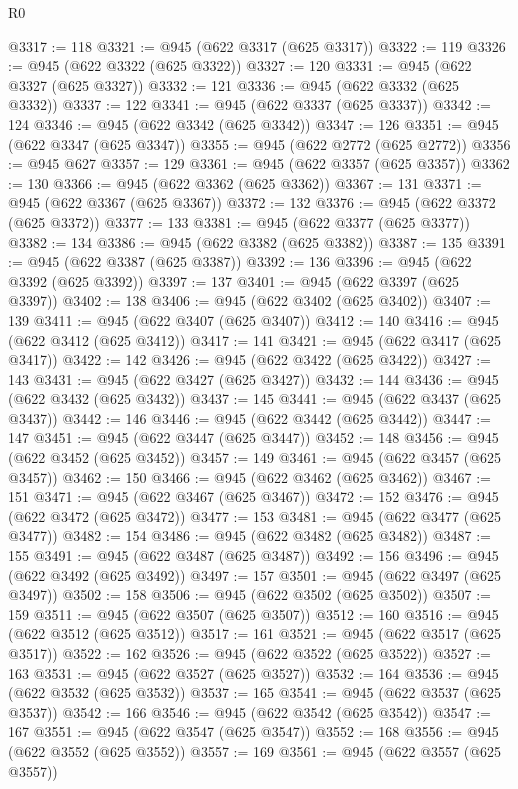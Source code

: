 \begin{lexlean}{R0}
\begin{coremodule}
@3317 := 118
@3321 := @945 (@622 @3317 (@625 @3317))
@3322 := 119
@3326 := @945 (@622 @3322 (@625 @3322))
@3327 := 120
@3331 := @945 (@622 @3327 (@625 @3327))
@3332 := 121
@3336 := @945 (@622 @3332 (@625 @3332))
@3337 := 122
@3341 := @945 (@622 @3337 (@625 @3337))
@3342 := 124
@3346 := @945 (@622 @3342 (@625 @3342))
@3347 := 126
@3351 := @945 (@622 @3347 (@625 @3347))
@3355 := @945 (@622 @2772 (@625 @2772))
@3356 := @945 @627
@3357 := 129
@3361 := @945 (@622 @3357 (@625 @3357))
@3362 := 130
@3366 := @945 (@622 @3362 (@625 @3362))
@3367 := 131
@3371 := @945 (@622 @3367 (@625 @3367))
@3372 := 132
@3376 := @945 (@622 @3372 (@625 @3372))
@3377 := 133
@3381 := @945 (@622 @3377 (@625 @3377))
@3382 := 134
@3386 := @945 (@622 @3382 (@625 @3382))
@3387 := 135
@3391 := @945 (@622 @3387 (@625 @3387))
@3392 := 136
@3396 := @945 (@622 @3392 (@625 @3392))
@3397 := 137
@3401 := @945 (@622 @3397 (@625 @3397))
@3402 := 138
@3406 := @945 (@622 @3402 (@625 @3402))
@3407 := 139
@3411 := @945 (@622 @3407 (@625 @3407))
@3412 := 140
@3416 := @945 (@622 @3412 (@625 @3412))
@3417 := 141
@3421 := @945 (@622 @3417 (@625 @3417))
@3422 := 142
@3426 := @945 (@622 @3422 (@625 @3422))
@3427 := 143
@3431 := @945 (@622 @3427 (@625 @3427))
@3432 := 144
@3436 := @945 (@622 @3432 (@625 @3432))
@3437 := 145
@3441 := @945 (@622 @3437 (@625 @3437))
@3442 := 146
@3446 := @945 (@622 @3442 (@625 @3442))
@3447 := 147
@3451 := @945 (@622 @3447 (@625 @3447))
@3452 := 148
@3456 := @945 (@622 @3452 (@625 @3452))
@3457 := 149
@3461 := @945 (@622 @3457 (@625 @3457))
@3462 := 150
@3466 := @945 (@622 @3462 (@625 @3462))
@3467 := 151
@3471 := @945 (@622 @3467 (@625 @3467))
@3472 := 152
@3476 := @945 (@622 @3472 (@625 @3472))
@3477 := 153
@3481 := @945 (@622 @3477 (@625 @3477))
@3482 := 154
@3486 := @945 (@622 @3482 (@625 @3482))
@3487 := 155
@3491 := @945 (@622 @3487 (@625 @3487))
@3492 := 156
@3496 := @945 (@622 @3492 (@625 @3492))
@3497 := 157
@3501 := @945 (@622 @3497 (@625 @3497))
@3502 := 158
@3506 := @945 (@622 @3502 (@625 @3502))
@3507 := 159
@3511 := @945 (@622 @3507 (@625 @3507))
@3512 := 160
@3516 := @945 (@622 @3512 (@625 @3512))
@3517 := 161
@3521 := @945 (@622 @3517 (@625 @3517))
@3522 := 162
@3526 := @945 (@622 @3522 (@625 @3522))
@3527 := 163
@3531 := @945 (@622 @3527 (@625 @3527))
@3532 := 164
@3536 := @945 (@622 @3532 (@625 @3532))
@3537 := 165
@3541 := @945 (@622 @3537 (@625 @3537))
@3542 := 166
@3546 := @945 (@622 @3542 (@625 @3542))
@3547 := 167
@3551 := @945 (@622 @3547 (@625 @3547))
@3552 := 168
@3556 := @945 (@622 @3552 (@625 @3552))
@3557 := 169
@3561 := @945 (@622 @3557 (@625 @3557))

\end{coremodule}
\end{lexlean}
